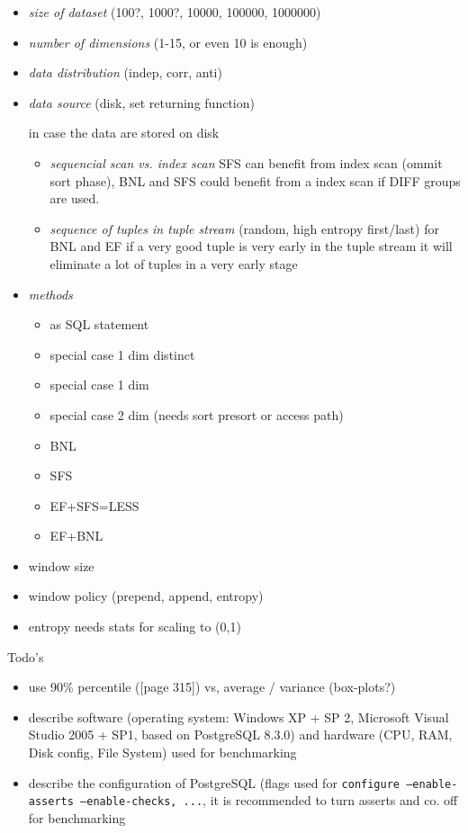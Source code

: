 \begin{itemize}
\item \emph{size of dataset} (100?, 1000?, 10000, 100000, 1000000)
\item \emph{number of dimensions} (1-15, or even 10 is enough)
\item \emph{data distribution} (indep, corr, anti)
\item \emph{data source} (disk, set returning function)

in case the data are stored on disk
\begin{itemize}
\item \emph{sequencial scan vs. index scan} SFS can benefit from index scan (ommit sort phase), BNL and SFS could benefit from a index scan if DIFF groups are used.
\item \emph{sequence of tuples in tuple stream} (random, high entropy first/last) for BNL and EF if a very good tuple is very early in the tuple stream it will eliminate a lot of tuples in a very early stage
\end{itemize}
\item \emph{methods}

\begin{itemize}
\item as SQL statement
\item special case 1 dim distinct
\item special case 1 dim 
\item special case 2 dim (needs sort presort or access path)
\item BNL
\item SFS
\item EF+SFS=LESS
\item EF+BNL
\end{itemize}

\item window size
\item window policy (prepend, append, entropy)
\item entropy needs stats for scaling to (0,1)

\end{itemize}

Todo's

\begin{itemize}
\item use 90\% percentile (\citep{Gray1993}[page 315]) vs, average / variance (box-plots?)
\item describe software (operating system: Windows XP + SP 2, Microsoft Visual Studio 2005 + SP1, based on PostgreSQL 8.3.0) and hardware (CPU, RAM, Disk config, File System) used for benchmarking

\item describe the configuration of PostgreSQL (flags used for \texttt{configure --enable-asserts --enable-checks, ...}, it is recommended to turn asserts and co. off for benchmarking
\end{itemize}


